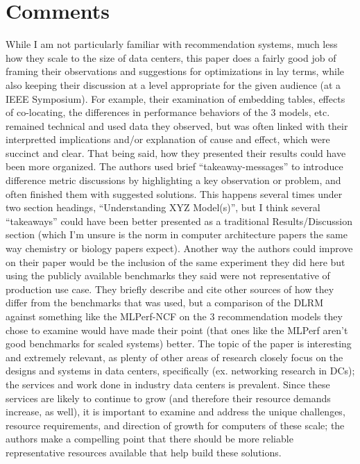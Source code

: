 \documentclass [12pt]{article}
\begin{document}
    \section{Comments} %
    \label{sec:comments}

    While I am not particularly familiar with recommendation systems, much less how they scale to the size of data centers, this paper does a fairly good job of framing their observations and suggestions for optimizations in lay terms, while also keeping their discussion at a level appropriate for the given audience (at a IEEE Symposium). For example, their examination of embedding tables, effects of co-locating, the differences in performance behaviors of the 3 models, etc. remained technical and used data they observed, but was often linked with their interpretted implications and/or explanation of cause and effect, which were succinct and clear. That being said, how they presented their results could have been more organized. The authors used brief ``takeaway-messages'' to introduce difference metric discussions by highlighting a key observation or problem, and often finished them with suggested solutions. This happens several times under two section headings, ``Understanding XYZ Model(s)'', but I think several ``takeaways'' could have been better presented as a traditional Results/Discussion section (which I'm unsure is the norm in computer architecture papers the same way chemistry or biology papers expect). Another way the authors could improve on their paper would be the inclusion of the same experiment they did here but using the publicly available benchmarks they said were not representative of production use case. They briefly describe and cite other sources of how they differ from the benchmarks that was used, but a comparison of the DLRM against something like the MLPerf-NCF on the 3 recommendation models they chose to examine would have made their point (that ones like the MLPerf aren't good benchmarks for scaled systems) better. The topic of the paper is interesting and extremely relevant, as plenty of other areas of research closely focus on the designs and systems in data centers, specifically (ex. networking research in DCs); the services and work done in industry data centers is prevalent. Since these services are likely to continue to grow (and therefore their resource demands increase, as well), it is important to examine and address the unique challenges, resource requirements, and direction of growth for computers of these scale; the authors make a compelling point that there should be more reliable representative resources available that help build these solutions. 
    
\end{document}

